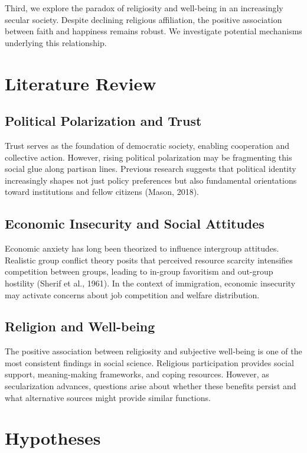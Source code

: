 \documentclass[12pt,a4paper]{article}
\begin{document}
Third, we explore the paradox of religiosity and well-being in an increasingly 
secular society. Despite declining religious affiliation, the positive association 
between faith and happiness remains robust. We investigate potential mechanisms 
underlying this relationship.

\section{Literature Review}

\subsection{Political Polarization and Trust}

Trust serves as the foundation of democratic society, enabling cooperation and 
collective action. However, rising political polarization may be fragmenting 
this social glue along partisan lines. Previous research suggests that political 
identity increasingly shapes not just policy preferences but also fundamental 
orientations toward institutions and fellow citizens (Mason, 2018).

\subsection{Economic Insecurity and Social Attitudes}

Economic anxiety has long been theorized to influence intergroup attitudes. 
Realistic group conflict theory posits that perceived resource scarcity intensifies 
competition between groups, leading to in-group favoritism and out-group hostility 
(Sherif et al., 1961). In the context of immigration, economic insecurity may 
activate concerns about job competition and welfare distribution.

\subsection{Religion and Well-being}

The positive association between religiosity and subjective well-being is one of 
the most consistent findings in social science. Religious participation provides 
social support, meaning-making frameworks, and coping resources. However, as 
secularization advances, questions arise about whether these benefits persist 
and what alternative sources might provide similar functions.

\section{Hypotheses}
\end{document}
